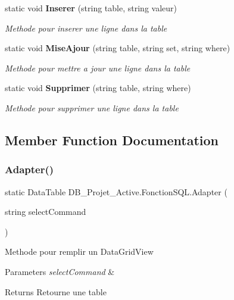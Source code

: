 \begin{DoxyCompactItemize}
static void \textbf{ Inserer} (string table, string valeur)
\begin{DoxyCompactList}\small\item\em Methode pour inserer une ligne dans la table \end{DoxyCompactList}\item 
static void \textbf{ Mise\+Ajour} (string table, string set, string where)
\begin{DoxyCompactList}\small\item\em Methode pour mettre a jour une ligne dans la table \end{DoxyCompactList}\item 
static void \textbf{ Supprimer} (string table, string where)
\begin{DoxyCompactList}\small\item\em Methode pour supprimer une ligne dans la table \end{DoxyCompactList}\end{DoxyCompactItemize}


\subsection{Member Function Documentation}
\mbox{\label{class_d_b___projet___active_1_1_fonction_s_q_l_a66b653f2a7d59d04cac5946751d79d0a}} 
\subsubsection{Adapter()}
{\footnotesize\ttfamily static Data\+Table D\+B\+\_\+\+Projet\+\_\+\+Active.\+Fonction\+S\+Q\+L.\+Adapter (\begin{DoxyParamCaption}\item[{string}]{select\+Command }\end{DoxyParamCaption})\hspace{0.3cm}{\ttfamily [static]}}



Methode pour remplir un Data\+Grid\+View 


\begin{DoxyParams}{Parameters}
{\em select\+Command} & \\
\hline
\end{DoxyParams}
\begin{DoxyReturn}{Returns}
Retourne une table
\end{DoxyReturn}
\mbox{\label{class_d_b___projet___active_1_1_fonction_s_q_l_ae2bd05ada96dba7e25c282195588c1ff}} 
